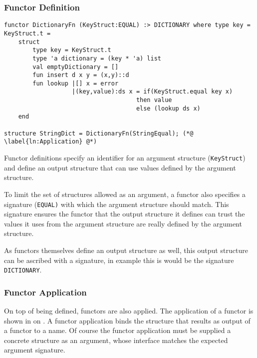 \documentclass[11pt]{article}
\begin{document}
\subsubsection{Functor Definition}
\begin{lstlisting}[label={lst:DictionaryFunctorExample}, caption={The Dictionary as a functor. The structures and signatures that this example depends on are shown in {\protect\myref{lst}{lst:AdditionalSignatures}} in Appendix {\protect\ref{app:AdditionalCode}}.}]
functor DictionaryFn (KeyStruct:EQUAL) :> DICTIONARY where type key = KeyStruct.t =
    struct
        type key = KeyStruct.t
        type 'a dictionary = (key * 'a) list
        val emptyDictionary = []
        fun insert d x y = (x,y)::d
        fun lookup |[] x = error
                   |(key,value):ds x = if(KeyStruct.equal key x)
                                     then value
                                     else (lookup ds x)
    end
    
structure StringDict = DictionaryFn(StringEqual); (*@ \label{ln:Application} @*)
\end{lstlisting}

Functor definitions specify an identifier for an argument structure (\lstinline{KeyStruct}) and define an output structure that can use values defined by the argument structure. 

To limit the set of structures allowed as an argument, a functor also specifies a signature (\lstinline{EQUAL)} with which the argument structure should match.
This signature ensures the functor that the output structure it defines can trust the values it uses from the argument structure are really defined by the argument structure.

As functors themselves define an output structure as well, this output structure can be ascribed with a signature, in example  this is would be the signature \lstinline{DICTIONARY}.

\subsubsection{Functor Application}
On top of being defined, functors are also applied.
The application of a functor is shown in  on .
A functor application binds the structure that results as output of a functor to a name.
Of course the functor application must be supplied a concrete structure as an argument, whose interface matches the expected argument signature.
\end{document}
